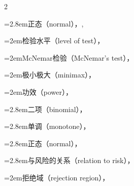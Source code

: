 \begin{multicols}{2}
\par\noindent\hangindent=2.8em\hspace*{1.8em}\label{idx:497}正态（normal），\hyperref[ex:8.2.9]{\pageref*{ex:8.2.9}}, \hyperref[ex:8.3.25]{\pageref*{ex:8.3.25}}\par
\par\noindent\hangindent=2em\hspace*{1em}\label{idx:498}检验水平（level of test），\hyperref[def:8.3.6]{\pageref*{def:8.3.6}}\par
\par\noindent\hangindent=2em\hspace*{1em}\label{idx:499}McNemar检验（McNemar’s test），\hyperref[exercise:10.32]{\pageref*{exercise:10.32}}\par
\par\noindent\hangindent=2em\hspace*{1em}\label{idx:500}极小极大（minimax），\hyperref[exercise:8.58]{\pageref*{exercise:8.58}}\par
\par\noindent\hangindent=2em\hspace*{1em}\label{idx:501}功效（power），\hyperref[def:8.3.1]{\pageref*{def:8.3.1}}\par
\par\noindent\hangindent=2.8em\hspace*{1.8em}\label{idx:502}二项（binomial），\hyperref[ex:8.3.2]{\pageref*{ex:8.3.2}}\par
\par\noindent\hangindent=2.8em\hspace*{1.8em}\label{idx:503}单调（monotone），\hyperref[sec:8.5.1]{\pageref*{sec:8.5.1}}\par
\par\noindent\hangindent=2.8em\hspace*{1.8em}\label{idx:504}正态（normal），\hyperref[ex:8.3.3]{\pageref*{ex:8.3.3}}\par
\par\noindent\hangindent=2.8em\hspace*{1.8em}\label{idx:505}与风险的关系（relation to risk），\hyperref[eq:8.3.12]{\pageref*{eq:8.3.12}}\par
\par\noindent\hangindent=2em\hspace*{1em}\label{idx:506}拒绝域（rejection region），\hyperref[idxocc:506:333]{\pageref*{idxocc:506:333}}\par

\end{multicols}
